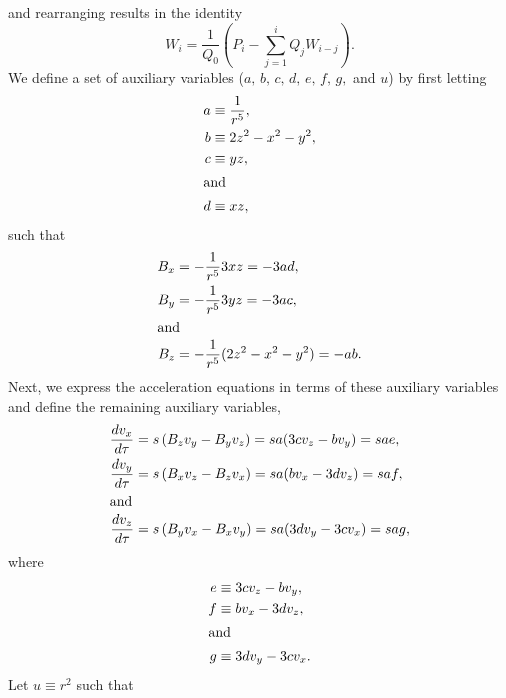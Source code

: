 \documentclass{article}
\begin{document}
and rearranging results in the identity
        \begin{equation}
            W_i=\frac{1}{Q_0}\left(P_i-\sum_{j=1}^i Q_jW_{i-j}\right).
            \label{EQN: Cauchy a/b}
        \end{equation}
We define a set of auxiliary variables ($a,\,b,\,c,\,d,\,e,\,f,\,g,$ and $u$) by first letting
        \begin{align*}
            a &\equiv \frac{1}{r^5}, \\
            b &\equiv 2z^2-x^2-y^2, \\
            c &\equiv yz,\\
         \intertext{and}
            d &\equiv xz,
        \end{align*}
such that
        \begin{align*}
           B_x&=-\frac{1}{r^5}3xz=-3ad,\\
           B_y&=-\frac{1}{r^5}3yz=-3ac,\\
         \intertext{and}
            B_z&=-\frac{1}{r^5}(2z^2-x^2-y^2)=-ab.
        \end{align*}
Next, we express the acceleration equations in terms of these auxiliary variables and define the remaining auxiliary variables,
        \begin{align*}
            \frac{dv_x}{d\tau} &= s\left(B_z v_y - B_y v_z\right)
            = sa(3c v_z - b v_y) = sae, \\
            \frac{dv_y}{d\tau} &= s\left(B_x v_z - B_z v_x\right)
            = sa(b v_x - 3d v_z) = saf, \\
         \intertext{and}
            \frac{dv_z}{d\tau} &= s\left(B_y v_x - B_x v_y\right)
            = sa(3d v_y - 3c v_x) = sag,
        \end{align*}
where
        \begin{align*}
            e &\equiv 3c v_z - b v_y, \\
            f &\equiv b v_x - 3d v_z, \\
         \intertext{and}
            g &\equiv 3d v_y - 3c v_x.
        \end{align*}
Let $u\equiv r^2$ such that
\end{document}
